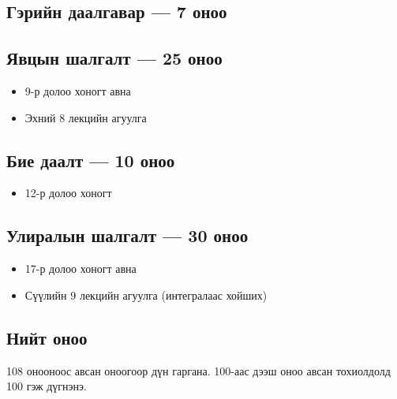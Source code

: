 \subsection*{Гэрийн даалгавар — 7 оноо}

\subsection*{Явцын шалгалт — 25 оноо}
\begin{itemize}
\item 9-р долоо хоногт авна
\item Эхний 8 лекцийн агуулга 
\end{itemize}

\subsection*{Бие даалт — 10 оноо}
\begin{itemize}
\item 12-р долоо хоногт

\end{itemize}

\subsection*{Улиралын шалгалт — 30 оноо}
\begin{itemize}
\item 17-р долоо хоногт авна
\item Сүүлийн 9 лекцийн агуулга (интегралаас хойших)
\end{itemize}

\subsection*{Нийт оноо}
108 онооноос авсан оноогоор дүн гаргана.  
100-аас дээш оноо авсан тохиолдолд 100 гэж дүгнэнэ.